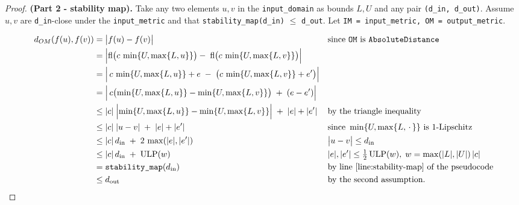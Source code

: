 \documentclass{article}
\begin{document}
\begin{proof}
    \textbf{(Part 2 - stability map).} Take any two elements $u,v$ in the \texttt{input\_domain} as bounds $L,U$ and any pair \texttt{(d\_in, d\_out)}. Assume $u,v$ are \texttt{d\_in}-close under the \texttt{input\_metric} and that \texttt{stability\_map(d\_in)} $\le$ \texttt{d\_out}. Let \texttt{IM = input\_metric, OM = output\_metric}.

\begin{align*}
  d_{OM}(f(u),f(v))
  &= \bigl|f(u)-f(v)\bigr|
    &&\text{since \texttt{OM} is \texttt{AbsoluteDistance}}\\
  &= \Bigl|\mathrm{fl}\bigl(c\,\min\{U,\max\{L,u\}\}\bigr)
            -\;\mathrm{fl}\bigl(c\,\min\{U,\max\{L,v\}\}\bigr)\Bigr|\\
  &= \Bigl|\,c\,\min\{U,\max\{L,u\}\} + e
           \;-\;\bigl(c\,\min\{U,\max\{L,v\}\}+e'\bigr)\Bigr|\\
  &= \Bigl|\,c\bigl(\min\{U,\max\{L,u\}\}-\min\{U,\max\{L,v\}\}\bigr)
           \;+\;(e - e')\Bigr|\\
  &\le |c|\;\Bigl|\min\{U,\max\{L,u\}\}-\min\{U,\max\{L,v\}\}\Bigr|
       \;+\;|e|+|e'|
    &&\text{by the triangle inequality}\\
  &\le |c|\;|u - v|
       \;+\;|e|+|e'|
    &&\text{since }\min\{U,\max\{L,\,\cdot\,\}\}\text{ is 1-Lipschitz}\\
  &\le |c|\,d_{\mathrm{in}}
       \;+\;2\,\max(|e|,|e'|)
    &&\bigl|u-v\bigr|\le d_{\mathrm{in}}\\
  &\le |c|\,d_{\mathrm{in}}
       \;+\;\mathrm{ULP}(w)
    &&|e|,|e'|\le\tfrac12\,\mathrm{ULP}(w),\;w=\max(|L|,|U|)\,|c|\\
  &= \texttt{stability\_map}(d_{\mathrm{in}})
    &&\text{by line \ref{line:stability-map} of the pseudocode}\\
  &\le d_{\mathrm{out}}
    &&\text{by the second assumption.}
\end{align*}

\end{proof}
\end{document}
